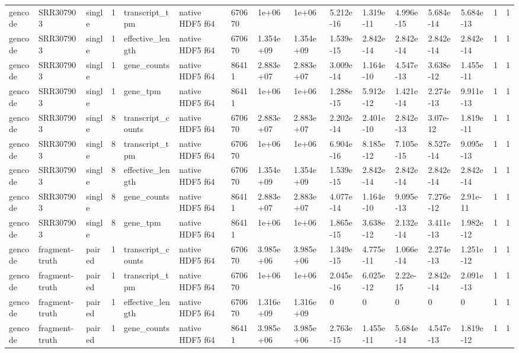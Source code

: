 \begin{tabular}{llllllllllllllll}
gencode & SRR307903 & single & 1 & transcript\_tpm & native HDF5 f64 & 670670 & 1e+06 & 1e+06 & 5.212e-16 & 1.319e-11 & 4.996e-15 & 5.684e-14 & 5.684e-13 & 1 & 1 \\
gencode & SRR307903 & single & 1 & effective\_length & native HDF5 f64 & 670670 & 1.354e+09 & 1.354e+09 & 1.539e-15 & 2.842e-14 & 2.842e-14 & 2.842e-14 & 2.842e-14 & 1 & 1 \\
gencode & SRR307903 & single & 1 & gene\_counts & native HDF5 f64 & 86411 & 2.883e+07 & 2.883e+07 & 3.009e-14 & 1.164e-10 & 4.547e-13 & 3.638e-12 & 1.455e-11 & 1 & 1 \\
gencode & SRR307903 & single & 1 & gene\_tpm & native HDF5 f64 & 86411 & 1e+06 & 1e+06 & 1.288e-15 & 5.912e-12 & 1.421e-14 & 2.274e-13 & 9.911e-13 & 1 & 1 \\
gencode & SRR307903 & single & 8 & transcript\_counts & native HDF5 f64 & 670670 & 2.883e+07 & 2.883e+07 & 2.202e-14 & 2.401e-10 & 2.842e-13 & 3.07e-12 & 1.819e-11 & 1 & 1 \\
gencode & SRR307903 & single & 8 & transcript\_tpm & native HDF5 f64 & 670670 & 1e+06 & 1e+06 & 6.904e-16 & 8.185e-12 & 7.105e-15 & 8.527e-14 & 9.095e-13 & 1 & 1 \\
gencode & SRR307903 & single & 8 & effective\_length & native HDF5 f64 & 670670 & 1.354e+09 & 1.354e+09 & 1.539e-15 & 2.842e-14 & 2.842e-14 & 2.842e-14 & 2.842e-14 & 1 & 1 \\
gencode & SRR307903 & single & 8 & gene\_counts & native HDF5 f64 & 86411 & 2.883e+07 & 2.883e+07 & 4.077e-14 & 1.164e-10 & 9.095e-13 & 7.276e-12 & 2.91e-11 & 1 & 1 \\
gencode & SRR307903 & single & 8 & gene\_tpm & native HDF5 f64 & 86411 & 1e+06 & 1e+06 & 1.865e-15 & 3.638e-12 & 2.132e-14 & 3.411e-13 & 1.982e-12 & 1 & 1 \\
gencode & fragment-truth & paired & 1 & transcript\_counts & native HDF5 f64 & 670670 & 3.985e+06 & 3.985e+06 & 1.349e-15 & 4.775e-11 & 1.066e-14 & 2.274e-13 & 1.251e-12 & 1 & 1 \\
gencode & fragment-truth & paired & 1 & transcript\_tpm & native HDF5 f64 & 670670 & 1e+06 & 1e+06 & 2.045e-16 & 6.025e-12 & 2.22e-15 & 2.842e-14 & 2.091e-13 & 1 & 1 \\
gencode & fragment-truth & paired & 1 & effective\_length & native HDF5 f64 & 670670 & 1.316e+09 & 1.316e+09 & 0 & 0 & 0 & 0 & 0 & 1 & 1 \\
gencode & fragment-truth & paired & 1 & gene\_counts & native HDF5 f64 & 86411 & 3.985e+06 & 3.985e+06 & 2.763e-15 & 1.455e-11 & 5.684e-14 & 4.547e-13 & 1.819e-12 & 1 & 1 \\

\end{tabular}
